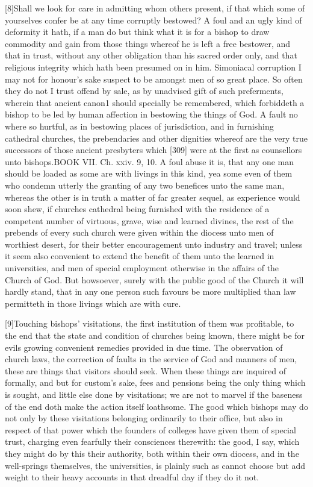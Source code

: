 [8]Shall we look for care in admitting whom others present, if that which some of yourselves confer be at any time corruptly bestowed? A foul and an ugly kind of deformity it hath, if a man do but think what it is for a bishop to draw commodity and gain from those things whereof he is left a free bestower, and that in trust, without any other obligation than his sacred order only, and that religious integrity which hath been presumed on in him. Simoniacal corruption I may not for honour’s sake suspect to be amongst men of so great place. So often they do not I trust offend by sale, as by unadvised gift of such preferments, wherein that ancient canon1 should specially be remembered, which forbiddeth a bishop to be led by human affection in bestowing the things of God. A fault no where so hurtful, as in bestowing places of jurisdiction, and in furnishing cathedral churches, the prebendaries and other dignities whereof are the very true successors of those ancient presbyters which [309] were at the first as counsellors unto bishops.BOOK VII. Ch. xxiv. 9, 10. A foul abuse it is, that any one man should be loaded as some are with livings in this kind, yea some even of them who condemn utterly the granting of any two benefices unto the same man, whereas the other is in truth a matter of far greater sequel, as experience would soon shew, if churches cathedral being furnished with the residence of a competent number of virtuous, grave, wise and learned divines, the rest of the prebends of every such church were given within the diocess unto men of worthiest desert, for their better encouragement unto industry and travel; unless it seem also convenient to extend the benefit of them unto the learned in universities, and men of special employment otherwise in the affairs of the Church of God. But howsoever, surely with the public good of the Church it will hardly stand, that in any one person such favours be more multiplied than law permitteth in those livings which are with cure.

[9]Touching bishops’ visitations, the first institution of them was profitable, to the end that the state and condition of churches being known, there might be for evils growing convenient remedies provided in due time. The observation of church laws, the correction of faults in the service of God and manners of men, these are things that visitors should seek. When these things are inquired of formally, and but for custom’s sake, fees and pensions being the only thing which is sought, and little else done by visitations; we are not to marvel if the baseness of the end doth make the action itself loathsome. The good which bishops may do not only by these visitations belonging ordinarily to their office, but also in respect of that power which the founders of colleges have given them of special trust, charging even fearfully their consciences therewith: the good, I say, which they might do by this their authority, both within their own diocess, and in the well-springs themselves, the universities, is plainly such as cannot choose but add weight to their heavy accounts in that dreadful day if they do it not.

